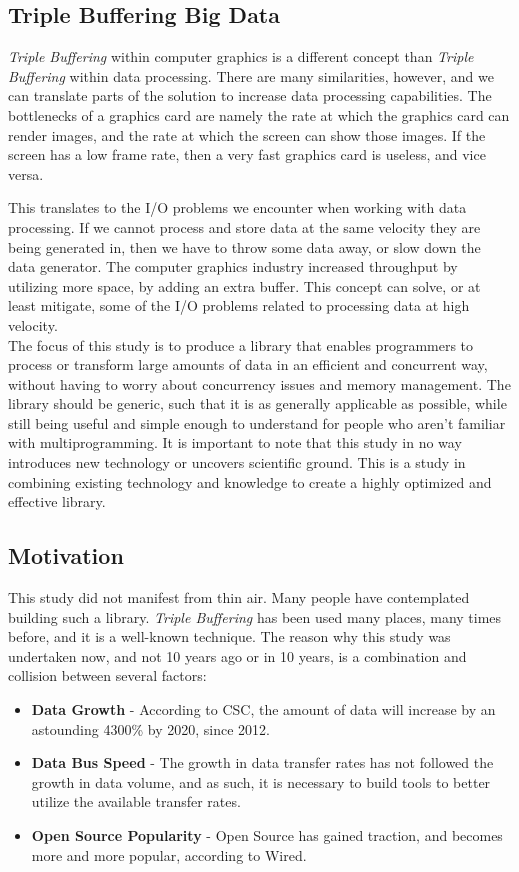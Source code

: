 \documentclass[a4paper]{article}
\begin{document}
\subsection{Triple Buffering Big Data}
\textit{Triple Buffering} within computer graphics is a different concept than \textit{Triple Buffering} within data processing. There are many similarities, however, and we can translate parts of the solution to increase data processing capabilities. The bottlenecks of a graphics card are namely the rate at which the graphics card can render images, and the rate at which the screen can show those images. If the screen has a low frame rate, then a very fast graphics card is useless, and vice versa. 

This translates to the I/O problems we encounter when working with data processing. If we cannot process and store data at the same velocity they are being generated in, then we have to throw some data away, or slow down the data generator. The computer graphics industry increased throughput by utilizing more space, by adding an extra buffer. This concept can solve, or at least mitigate, some of the I/O problems related to processing data at high velocity.\\

The focus of this study is to produce a library that enables programmers to process or transform large amounts of data in an efficient and concurrent way, without having to worry about concurrency issues and memory management. The library should be generic, such that it is as generally applicable as possible, while still being useful and simple enough to understand for people who aren't familiar with multiprogramming. It is important to note that this study in no way introduces new technology or uncovers scientific ground. This is a study in combining existing technology and knowledge to create a highly optimized and effective library.


\subsection{Motivation}
This study did not manifest from thin air. Many people have contemplated building such a library. \textit{Triple Buffering} has been used many places, many times before, and it is a well-known technique. The reason why this study was undertaken now, and not 10 years ago or in 10 years, is a combination and collision between several factors:

\begin{itemize}
\item \textbf{Data Growth} - According to CSC, the amount of data will increase by an astounding 4300\% by 2020, since 2012\cite{datagrowth}. 
\item \textbf{Data Bus Speed} - The growth in data transfer rates has not followed the growth in data volume, and as such, it is necessary to build tools to better utilize the available transfer rates.
\item \textbf{Open Source Popularity} - Open Source has gained traction, and becomes more and more popular, according to Wired\cite{opensourcegrowth}.
\end{itemize} 
\end{document}
